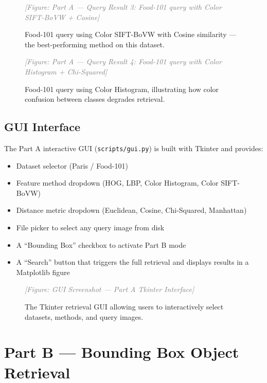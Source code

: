 \documentclass[11pt, a4paper]{article}
\newcommand{\imagebox}[2]{%
  \begin{mdframed}[backgroundcolor=gray!15, linecolor=gray!50, linewidth=1pt]
    \centering
    \vspace{#2}
    \textcolor{gray}{\textit{[Figure: #1]}}
    \vspace{#2}
  \end{mdframed}
}
\begin{document}
\begin{figure}[H]
  \centering
  \imagebox{Part A — Query Result 3: Food-101 query with Color SIFT-BoVW + Cosine}{3cm}
  \caption{Food-101 query using Color SIFT-BoVW with Cosine similarity — the best-performing method on this dataset.}
  \label{fig:partA_food_1}
\end{figure}

\begin{figure}[H]
  \centering
  \imagebox{Part A — Query Result 4: Food-101 query with Color Histogram + Chi-Squared}{3cm}
  \caption{Food-101 query using Color Histogram, illustrating how color confusion between classes degrades retrieval.}
  \label{fig:partA_food_2}
\end{figure}

\subsection{GUI Interface}
The Part A interactive GUI (\texttt{scripts/gui.py}) is built with Tkinter and provides:
\begin{itemize}
  \item Dataset selector (Paris / Food-101)
  \item Feature method dropdown (HOG, LBP, Color Histogram, Color SIFT-BoVW)
  \item Distance metric dropdown (Euclidean, Cosine, Chi-Squared, Manhattan)
  \item File picker to select any query image from disk
  \item A ``Bounding Box'' checkbox to activate Part B mode
  \item A ``Search'' button that triggers the full retrieval and displays results in a Matplotlib figure
\end{itemize}

\begin{figure}[H]
  \centering
  \imagebox{GUI Screenshot — Part A Tkinter Interface}{2.5cm}
  \caption{The Tkinter retrieval GUI allowing users to interactively select datasets, methods, and query images.}
  \label{fig:gui_partA}
\end{figure}

\newpage
\section{Part B — Bounding Box Object Retrieval}
\end{document}
